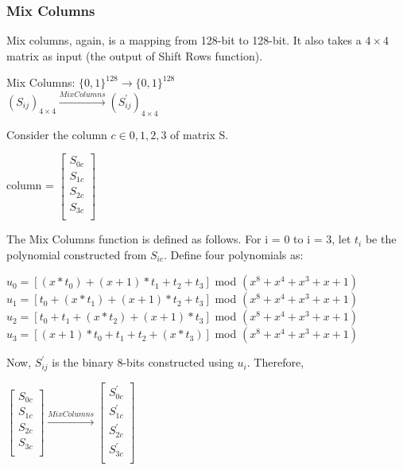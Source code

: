 \documentclass[11pt]{article}
\begin{document}
\subsubsection{Mix Columns}
Mix columns, again, is a mapping from 128-bit to 128-bit. It also takes a $4 \times 4$ matrix as input (the output of Shift Rows function).
\begin{center}
    Mix Columns: $\{0, 1\}^{128} \rightarrow \{0, 1\}^{128}$\\
    \vspace{1mm}
    $(S_{ij})_{4 \times 4} \xrightarrow{Mix Columns} (S_{ij}^{'})_{4 \times 4}$
\end{center}
Consider the column $c \in {0,1,2,3}$ of matrix S.
\begin{center}
    column = $\begin{bmatrix}
        S_{0c}\\
        S_{1c}\\
        S_{2c}\\
        S_{3c}\\
    \end{bmatrix}$
\end{center}
The Mix Columns function is defined as follows. For i = 0 to i = 3, let $t_i$ be the polynomial constructed from $S_{ic}$. Define four polynomials as:
\begin{center}
    $u_0 = [(x * t_0) + (x + 1) * t_1 + t_2 + t_3]$ mod $(x^8 + x^4 + x^3 + x + 1)$\\
    \vspace{1mm}
    $u_1 = [t_0 + (x * t_1) + (x + 1) * t_2 + t_3]$ mod $(x^8 + x^4 + x^3 + x + 1)$\\
    \vspace{1mm}
    $u_2 = [t_0 + t_1 + (x * t_2) + (x + 1) * t_3]$ mod $(x^8 + x^4 + x^3 + x + 1)$\\
    \vspace{1mm}
    $u_3 = [(x + 1) * t_0 + t_1 + t_2 + (x * t_3)]$ mod $(x^8 + x^4 + x^3 + x + 1)$\\
\end{center}
Now, $S_{ij}^{'}$ is the binary 8-bits constructed using $u_i$. Therefore, 
\begin{center}
    $\begin{bmatrix}
        S_{0c}\\
        S_{1c}\\
        S_{2c}\\
        S_{3c}\\
    \end{bmatrix}
    \xrightarrow{Mix Columns}
    \begin{bmatrix}
        S_{0c}^{'}\\
        S_{1c}^{'}\\
        S_{2c}^{'}\\
        S_{3c}^{'}\\
    \end{bmatrix}$
\end{center}
\end{document}
